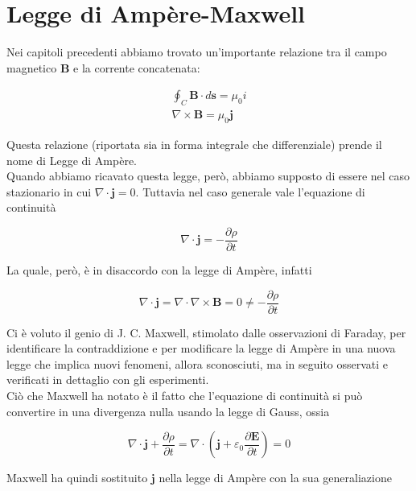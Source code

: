 \chapter{Legge di Ampère-Maxwell}

Nei capitoli precedenti abbiamo trovato un'importante relazione tra il campo magnetico $\mathbf{B}$ e la corrente concatenata:

\begin{align}
    \oint_{C} \mathbf{B} \cdot d \mathbf{s} = \mu_0 i \\
    \nabla \times \mathbf{B} = \mu_0 \mathbf{j}
\end{align}

Questa relazione (riportata sia in forma integrale che differenziale) prende il nome di Legge di Ampère. \\

Quando abbiamo ricavato questa legge, però, abbiamo supposto di essere nel caso stazionario in cui $\nabla \cdot \mathbf{j} = 0$. Tuttavia nel caso generale vale l'equazione di continuità 

\begin{equation*}
    \nabla \cdot \mathbf{j} = - \frac{\partial \rho}{\partial t}
\end{equation*}

La quale, però, è in disaccordo con la legge di Ampère, infatti

\begin{equation}
    \nabla \cdot \mathbf{j} = \nabla \cdot \nabla \times \mathbf{B} = 0 \neq - \frac{\partial \rho}{\partial t}
\end{equation}

Ci è voluto il genio di J. C. Maxwell, stimolato dalle osservazioni di Faraday, per identificare la contraddizione e per modificare la legge di Ampère in una nuova legge che implica nuovi fenomeni, allora sconosciuti, ma in seguito osservati e verificati in dettaglio con gli esperimenti.\\

Ciò che Maxwell ha notato è il fatto che l'equazione di continuità si può convertire in una divergenza nulla usando la legge di Gauss, ossia 

\begin{equation}
    \nabla \cdot \mathbf{j} + \frac{\partial \rho}{\partial t} = \nabla \cdot \left( \mathbf{j} + \varepsilon_0 \frac{\partial \mathbf{E}}{\partial t} \right) = 0
\end{equation}

Maxwell ha quindi sostituito $\mathbf{j}$ nella legge di Ampère con la sua generaliazione 

